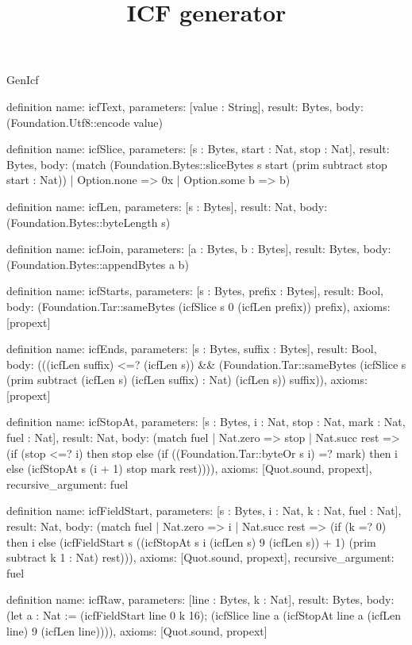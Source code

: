 \begin{lexlean}{GenIcf}
\title{ICF generator}
\begin{semanticmodule}
definition{
  name: icfText,
  parameters: [value : String],
  result: Bytes,
  body: (Foundation.Utf8::encode value)
}

definition{
  name: icfSlice,
  parameters: [s : Bytes, start : Nat, stop : Nat],
  result: Bytes,
  body: (match (Foundation.Bytes::sliceBytes s start (prim subtract stop start : Nat))
    | Option.none => 0x
    | Option.some b => b)
}

definition{
  name: icfLen,
  parameters: [s : Bytes],
  result: Nat,
  body: (Foundation.Bytes::byteLength s)
}

definition{
  name: icfJoin,
  parameters: [a : Bytes, b : Bytes],
  result: Bytes,
  body: (Foundation.Bytes::appendBytes a b)
}

definition{
  name: icfStarts,
  parameters: [s : Bytes, prefix : Bytes],
  result: Bool,
  body: (Foundation.Tar::sameBytes (icfSlice s 0 (icfLen prefix)) prefix),
  axioms: [propext]
}

definition{
  name: icfEnds,
  parameters: [s : Bytes, suffix : Bytes],
  result: Bool,
  body: (((icfLen suffix) <=? (icfLen s)) && (Foundation.Tar::sameBytes (icfSlice s (prim subtract (icfLen s) (icfLen suffix) : Nat) (icfLen s)) suffix)),
  axioms: [propext]
}

definition{
  name: icfStopAt,
  parameters: [s : Bytes, i : Nat, stop : Nat, mark : Nat, fuel : Nat],
  result: Nat,
  body: (match fuel
    | Nat.zero => stop
    | Nat.succ rest => (if (stop <=? i) then stop else (if ((Foundation.Tar::byteOr s i) =? mark) then i else (icfStopAt s (i + 1) stop mark rest)))),
  axioms: [Quot.sound, propext],
  recursive_argument: fuel
}

definition{
  name: icfFieldStart,
  parameters: [s : Bytes, i : Nat, k : Nat, fuel : Nat],
  result: Nat,
  body: (match fuel
    | Nat.zero => i
    | Nat.succ rest => (if (k =? 0) then i else (icfFieldStart s ((icfStopAt s i (icfLen s) 9 (icfLen s)) + 1) (prim subtract k 1 : Nat) rest))),
  axioms: [Quot.sound, propext],
  recursive_argument: fuel
}

definition{
  name: icfRaw,
  parameters: [line : Bytes, k : Nat],
  result: Bytes,
  body: (let a : Nat := (icfFieldStart line 0 k 16); (icfSlice line a (icfStopAt line a (icfLen line) 9 (icfLen line)))),
  axioms: [Quot.sound, propext]
}


\end{semanticmodule}
\end{lexlean}
